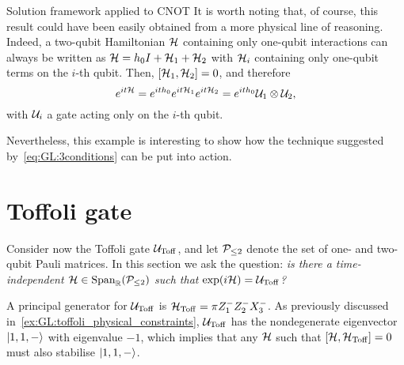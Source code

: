 \begin{examplebox}[label={ex:GL:cnot_with_conditions}]{Solution framework applied to CNOT}
It is worth noting that, of course, this result could have been easily obtained from a more physical line of reasoning. Indeed, a two-qubit Hamiltonian ${\mathcal{H}}$ containing only one-qubit interactions can always be written as ${\mathcal{H}}=h_0 I+{\mathcal{H}}_1+{\mathcal{H}}_2$ with ${\mathcal{H}}_i$ containing only one-qubit terms on the $i$-th qubit. Then, $[{\mathcal{H}}_1,{\mathcal{H}}_2]=0$, and therefore
\begin{equation}
    e^{it{\mathcal{H}}}=e^{it h_0}e^{it{\mathcal{H}}_1}e^{it{\mathcal{H}}_2}=e^{it h_0} {\mathcal{U}}_1\otimes{\mathcal{U}}_2,
\end{equation}
with ${\mathcal{U}}_i$ a gate acting only on the $i$-th qubit.

Nevertheless, this example is interesting to show how the technique suggested by~\cref{eq:GL:3conditions} can be put into action.
\end{examplebox}


\section{Toffoli gate\ccheck}
\label{sec:GL:toffoli}

Consider now the Toffoli gate ${\mathcal{U}}_{\operatorname{Toff}}$, and let ${\mathcal{P}}_{\le2}$ denote the set of one- and two-qubit Pauli matrices. In this section we ask the question: \emph{is there a time-independent ${\mathcal{H}}\in\operatorname{Span}_{{\mathbb{R}}}({\mathcal{P}}_{\le2})$ such that $\exponential(i\calH)=\UToff$?}

A principal generator for ${\mathcal{U}}_{\operatorname{Toff}}$ is ${\mathcal{H}}_{\operatorname{Toff}}=\pi Z_1^- Z_2^- X_3^-$.
As previously discussed in~\cref{ex:GL:toffoli_physical_constraints}, ${\mathcal{U}}_{\operatorname{Toff}}$ has the nondegenerate eigenvector $\ket{1,1,-}$ with eigenvalue $-1$, which implies that any ${\mathcal{H}}$ such that $[{\mathcal{H}},{\mathcal{H}}_{\operatorname{Toff}}]=0$ must also stabilise $\ket{1,1,-}$.

